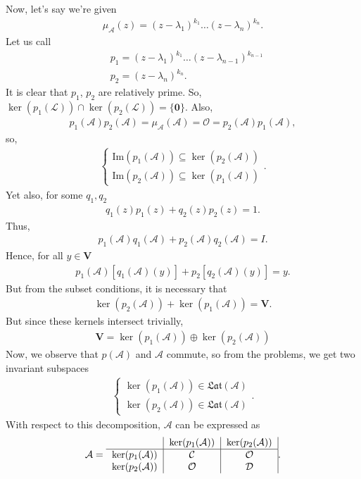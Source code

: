 \documentclass{article}
\theoremstyle{definition}
\newcommand{\V}{\mathbf{V}}
\newcommand{\A}{\mathcal{A}}
\newcommand{\lag}{\mathcal{L}}
\newcommand{\ima}{\text{Im}}
\begin{document}
Now, let's say we're given 
\begin{align*}
\mu_\A(z) = (z-\lambda_1)^{k_1} \dots (z - \lambda_n)^{k_n}.
\end{align*}
Let us call
\begin{align*}
&p_1 = (z-\lambda_1)^{k_1} \dots (z - \lambda_{n-1})^{k_{n-1}}\\
&p_2 = (z - \lambda_n)^{k_n}.
\end{align*}
It is clear that $p_1$, $p_2$ are relatively prime. So, $\ker(p_1(\lag)) \cap \ker(p_2(\lag)) = \{ \mathbf{0} \}$. Also,
\begin{align*}
p_1(\A)p_2(\A) = \mu_\A(\A) = \mathcal{O} = p_2(\A)p_1(\A),
\end{align*}
so,
\begin{align*}\label{im}
\begin{cases}
\ima(p_1(\A)) \subseteq \ker(p_2(\A))\\
\ima(p_2(\A)) \subseteq \ker(p_1(\A))
\end{cases}.
\end{align*}
Yet also, for some $q_1, q_2$
\begin{align*}
q_1(z)p_1(z) + q_2(z)p_2(z) = 1.
\end{align*}
Thus,
\begin{align*}
p_1(\A)q_1(\A) + p_2(\A)q_2(\A) = I.
\end{align*}
Hence, for all $y\in \V$
\begin{align*}
p_1(\A)[q_1(\A)(y)] + p_2[q_2(\A)(y)] = y.
\end{align*}
But from the subset conditions, it is necessary that
\begin{align*}
\ker(p_2(\A)) + \ker(p_1(\A)) = \V.
\end{align*}
But since these kernels intersect trivially, 
\begin{align*}
\boxed{\V = \ker(p_1(\A)) \oplus \ker(p_2(\A))}
\end{align*}
Now, we observe that $p(\A)$ and $\A$ commute, so from the problems, we get two invariant subspaces
\begin{align*}
\begin{cases}
\ker(p_1(\A)) \in \mathfrak{Lat}(\A)\\
\ker(p_2(\A)) \in \mathfrak{Lat}(\A)
\end{cases}.
\end{align*}
With respect to this decomposition, $\A$ can be expressed as
\begin{align*}
\A = \begin{tabular}{c|c|c|}
& $\ker(p_1(\A))$ & $\ker(p_2(\A))$\\
\hline
$\ker(p_1(\A))$& $\mathcal{C}$ & $\mathcal{O}$ \\	
$\ker(p_2(\A))$& $\mathcal{O}$ & $\mathcal{D}$ 
\end{tabular}.
\end{align*}
\end{document}
